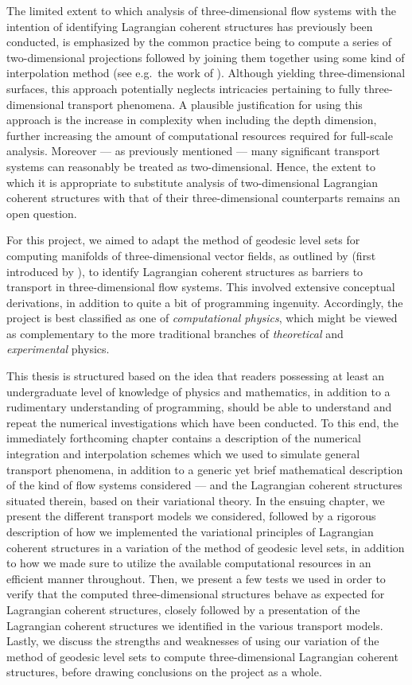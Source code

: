 The limited extent to which analysis of three-dimensional flow systems with the
intention of identifying Lagrangian coherent structures has previously been
conducted, is emphasized by the common practice being to compute a series of
two-dimensional projections followed by joining them together using
some kind of interpolation method (see e.g.\ the work of
\textcite{blazevski2014hyperbolic}). Although yielding three-dimensional
surfaces, this approach potentially neglects intricacies pertaining to fully
three-dimensional transport phenomena. A plausible justification for using
this approach is the increase in complexity when including the depth dimension,
further increasing the amount of computational resources required for
full-scale analysis. Moreover --- as previously mentioned --- many significant
transport systems can reasonably be treated as two-dimensional. Hence, the
extent to which it is appropriate to substitute analysis of two-dimensional
Lagrangian coherent structures with that of their three-dimensional
counterparts remains an open question.

For this project, we aimed to adapt the method of geodesic level sets for
computing manifolds of three-dimensional vector fields, as outlined by
\textcite{krauskopf2005survey} (first introduced by
\textcite{krauskopf2003computing}), to identify Lagrangian coherent structures
as barriers to transport in three-dimensional flow systems. This involved
extensive conceptual derivations, in addition to quite a bit of programming
ingenuity. Accordingly, the project is best classified as one of
\emph{computational physics}, which might be viewed as complementary to the
more traditional branches of \emph{theoretical} and \emph{experimental}
physics.

This thesis is structured based on the idea that readers possessing
at least an undergraduate level of knowledge of physics and mathematics, in
addition to a rudimentary understanding of programming, should be able to
understand and repeat the numerical investigations which have been conducted.
To this end, the immediately forthcoming chapter contains a description of the
numerical integration and interpolation schemes which we used to simulate
general transport phenomena, in addition to a generic yet brief mathematical
description of the kind of flow systems considered --- and the Lagrangian
coherent structures situated therein, based on their variational theory. In the
ensuing chapter, we present the different transport models we considered,
followed by a rigorous description of how we implemented the variational
principles of Lagrangian coherent structures in a variation of the method of
geodesic level sets, in addition to how we made sure to utilize the available
computational resources in an efficient manner throughout. Then, we present a
few tests we used in order to verify that the computed three-dimensional
structures behave as expected for Lagrangian coherent structures, closely
followed by a presentation of the Lagrangian coherent structures we identified
in the various transport models. Lastly, we discuss the strengths and
weaknesses of using our variation of the method of geodesic level sets to
compute three-dimensional Lagrangian coherent structures, before drawing
conclusions on the project as a whole.
